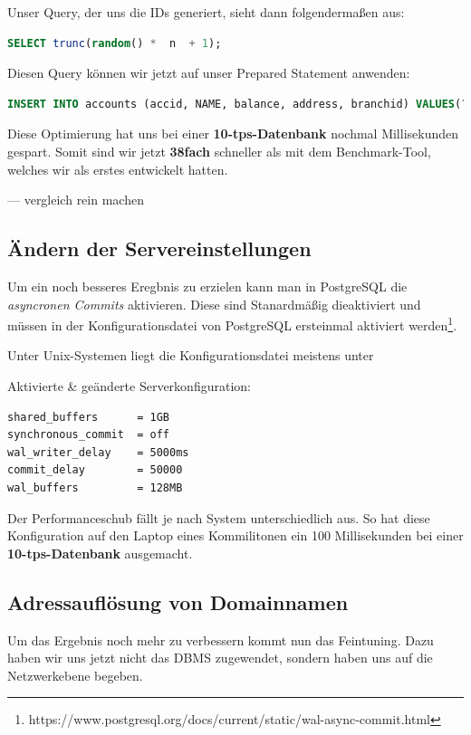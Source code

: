 Unser Query, der uns die IDs generiert, sieht dann folgendermaßen aus:
\begin{lstlisting}[language=sql]
SELECT trunc(random() *  n  + 1);
\end{lstlisting}

Diesen Query können wir jetzt auf unser Prepared Statement anwenden:
\begin{lstlisting}[language=sql, caption={INSERT-Query mit vom Server
generierten ID}]
INSERT INTO accounts (accid, NAME, balance, address, branchid) VALUES(?, 'account', 0,'test', trunc(random() * n + 1))
\end{lstlisting}

Diese Optimierung hat uns bei einer \textbf{10-tps-Datenbank} nochmal  Millisekunden gespart. Somit sind wir jetzt \textbf{38fach} schneller 
als mit dem Benchmark-Tool, welches wir als erstes entwickelt hatten.

--- vergleich rein machen

\subsection{Ändern der Servereinstellungen}

Um ein noch besseres Eregbnis zu erzielen kann man in PostgreSQL die
\textit{asyncronen Commits} aktivieren. Diese sind Stanardmäßig dieaktiviert und
müssen in der Konfigurationsdatei von PostgreSQL ersteinmal aktiviert werden\footnote{https://www.postgresql.org/docs/current/static/wal-async-commit.html}.

Unter Unix-Systemen liegt die Konfigurationsdatei meistens unter \newline
{}

Aktivierte \& geänderte Serverkonfiguration:
\begin{lstlisting}[title={Veränderte Serverkonfiguration}]
shared_buffers		= 1GB
synchronous_commit	= off
wal_writer_delay	= 5000ms
commit_delay		= 50000
wal_buffers			= 128MB
\end{lstlisting}

Der Performanceschub fällt je nach System unterschiedlich aus. So hat diese
Konfiguration auf den Laptop eines Kommilitonen ein 100 Millisekunden bei einer
\textbf{10-tps-Datenbank} ausgemacht.

\subsection{Adressauflösung von Domainnamen}
Um das Ergebnis noch mehr zu verbessern kommt nun das Feintuning. Dazu
haben wir uns jetzt nicht das DBMS zugewendet, sondern haben uns auf die
Netzwerkebene begeben.


